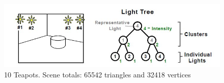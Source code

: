 \begin{figure}[h!]
  \centering
    \includegraphics[width=1.0\textwidth]{lightTree.jpg}
  \caption{10 Teapots. Scene totals: 65542 triangles and 32418 vertices}
	\label{fig:teapots}
\end{figure}

